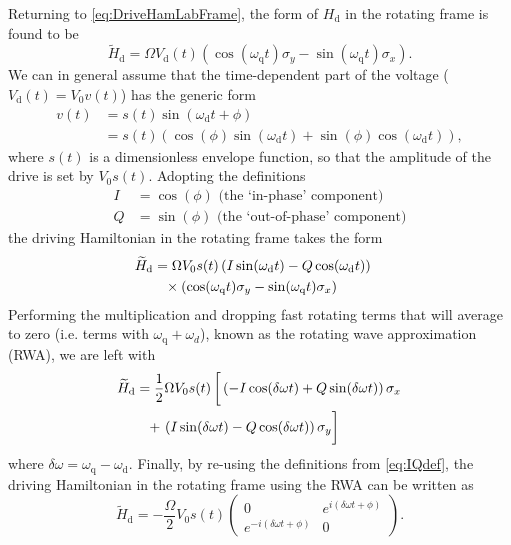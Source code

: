 \documentclass[aip,apr,twocolumn,showpacs,superscriptaddress,groupedaddress,nofootinbib,reprint]{revtex4-1}  %
\newcommand{\freq}{\omega_\text{q}}
\newcommand{\omegad}{\delta\omega}
\renewcommand{\d}{\text{d}}
\begin{document}
Returning to \cref{eq:DriveHamLabFrame}, the form of $H_\text{d}$ in the rotating frame is found to be
\begin{equation}
\widetilde H_\text{d} = \Omega V_\text{d}(t)\left(\cos(\omega_\text{q} t)\sigma_y - \sin(\omega_\text{q} t)\sigma_x\right).
\label{eq:RotatingFrame_drive}
\end{equation}
We can in general assume that the time-dependent part of the voltage ($V_\d(t) = V_0v(t)$) has the generic form
\begin{align}
v(t) & = s(t) \sin(\omega_\d t + \phi) \\
& = s(t)\left(\cos(\phi)\sin(\omega_\d t) + \sin(\phi)\cos(\omega_\d t) \right), \label{eq:IQdef}
\end{align}
where $s(t)$ is a dimensionless envelope function, so that the amplitude of the drive is set by $V_0s(t)$. Adopting the definitions
\begin{align}
I &= \cos(\phi) \text{ (the `in-phase' component)}\\
Q &= \sin(\phi) \text{ (the `out-of-phase' component)}
\end{align}
the driving Hamiltonian in the rotating frame takes the form
\begin{align}
\widetilde H_\text{d} &= \Omega V_0 s(t)\left( I \sin(\omega_\d t) - Q \cos(\omega_\d t)\right)\quad \nonumber\\
& \hphantom{=} \times \left(\cos(\freq t)\sigma_y - \sin(\freq t)\sigma_x\right)
\end{align}
Performing the multiplication and dropping fast rotating terms that will average to zero (i.e. terms with $\freq + \omega_d$), known as the rotating wave approximation (RWA), we are left with
\begin{align}
\widetilde H_\text{d}  & = \frac{1}{2} \Omega V_0 s(t) \left[\vphantom{\frac{2}{2}} \left(-I\cos(\omegad t) + Q\sin(\omegad t)\right)\sigma_x \right. \nonumber \\
& \hphantom{=} + \left. \left(I\sin(\omegad t) - Q\cos(\omegad t)\right)\sigma_y \vphantom{\frac{2}{2}}\right]
\end{align}
where $\omegad = \freq - \omega_\d$. Finally, by re-using the definitions from \cref{eq:IQdef}, the driving Hamiltonian in the rotating frame using the RWA can be written as
\begin{equation}
\widetilde H_\text{d} = -\frac{\Omega}{2}V_0s(t) \begin{pmatrix}
0 & e^{i(\omegad t + \phi)}\\
e^{-i(\omegad t + \phi)} & 0
\end{pmatrix} .\label{eq:finalDriveHam}
\end{equation}
\end{document}
